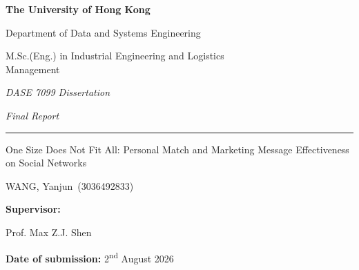 \newcommand{\dissertationtitle}{One Size Does Not Fit All: Personal Match and Marketing Message Effectiveness on Social Networks}
\newcommand{\studentname}{WANG, Yanjun}
\newcommand{\studentnumber}{3036492833}
\newcommand{\supervisorname}{Prof. Max Z.J. Shen}
\newcommand{\submissiondate}{2\textsuperscript{nd} August 2026}


\begin{titlepage}
\thispagestyle{empty}
\begin{singlespace}
\begin{center}
{\bfseries\fontsize{20}{24}\selectfont The University of Hong Kong\par}
\vspace{0.35cm}
{\fontsize{16}{19.2}\selectfont Department of Data and Systems Engineering\par}

\vspace{1.05cm}

{\fontsize{16}{19.2}\selectfont M.Sc.(Eng.) in Industrial Engineering and Logistics\\
Management\par}

\vspace{1.35cm}

{\itshape\fontsize{16}{19.2}\selectfont DASE 7099 Dissertation\par}

\vspace{1.1cm}

{\itshape\fontsize{16}{19.2}\selectfont Final Report\par}
\vspace{-0.25cm}
{\rule{3.2cm}{0.4pt}\par}

\vspace{1.45cm}

\begin{minipage}{0.82\textwidth}
\centering
{\fontsize{14}{16.8}\selectfont \dissertationtitle\par}
\end{minipage}

\vspace{1.45cm}

{\fontsize{14}{16.8}\selectfont \studentname\ (\studentnumber)\par}

\vspace{1.25cm}

{\bfseries\fontsize{14}{16.8}\selectfont Supervisor:\par}
\vspace{0.2cm}
{\fontsize{14}{16.8}\selectfont \supervisorname\par}

\vfill

{\fontsize{14}{16.8}\selectfont \textbf{Date of submission:} \submissiondate\par}
\end{center}
\end{singlespace}
\end{titlepage}

